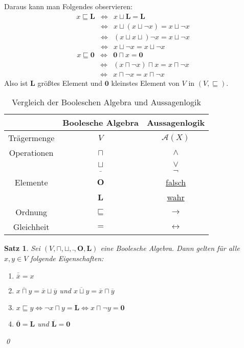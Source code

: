 \documentclass[ngerman]{scrartcl}
\theoremstyle{custom}
\newtheorem{ms}[mdef]{Satz}
\newcommand{\ax}{\mathcal{A}(X)}
\newcommand{\0}{\mathbf{0}}
\newcommand{\1}{\mathbf{L}}
\begin{document}
Daraus kann man Folgendes observieren:
\begin{eqnarray*}
x \sqsubseteq \mathbf{L} &\Leftrightarrow& x \sqcup \mathbf{L} = \mathbf{L} \\
&\Leftrightarrow& x \sqcup (x \sqcup \neg x) = x \sqcup \neg x\\
&\Leftrightarrow& (x \sqcup x \sqcup) \neg x = x \sqcup \neg x\\
&\Leftrightarrow& x \sqcup \neg x = x \sqcup \neg x
\end{eqnarray*}
\begin{eqnarray*}
x \sqsubseteq \mathbf{0} &\Leftrightarrow& \mathbf{0} \sqcap x =
\mathbf{0} \\
&\Leftrightarrow& (x \sqcap \neg x) \sqcap x = x \sqcap \neg x \\
&\Leftrightarrow& x \sqcap \neg x = x \sqcap \neg x
\end{eqnarray*}
Also ist $\mathbf{L}$ gr\"o\ss tes Element und $\mathbf{0}$ kleinstes Element von $V$ in $(V,
\sqsubseteq)$.

\begin{table}[h]
\center
\begin{tabular}{c|c|c}
& Boolesche Algebra & Aussagenlogik \\
\hline Tr\"agermenge & $V$ & $\ax$ \\
Operationen & $\sqcap$ & $\wedge$ \\
& $\sqcup$ & $\vee$ \\
& $\bar ~$ & $\neg$ \\
Elemente & $\mathbf{O}$ & \underline{falsch} \\
& $\mathbf{L}$& \underline{wahr}\\
Ordnung & $\sqsubseteq$ & $\rightarrow$ \\
Gleichheit & $=$ & $\leftrightarrow$
\end{tabular}
\caption{Vergleich der Booleschen Algebra und Aussagenlogik}
\end{table}

\begin{ms} 
Sei $(V, \sqcap, \sqcup, \bar ~, \mathbf{O}, \mathbf{L})$ eine
Boolesche Algebra. Dann gelten f\"ur alle $x,y \in V$ folgende
Eigenschaften:
\begin{enumerate}
\item $\overline{\overline{x}} = x$
\item $\overline{x \sqcap y} = \overline{x} \sqcup \overline{y}$ und
  $\overline{x \sqcup y} = \overline{x} \sqcap \overline{y}$
\item $x \sqsubseteq y \Leftrightarrow \neg x \sqcap y = \mathbf{L}
  \Leftrightarrow x \sqcap \neg y = \mathbf{0}$
\item $\overline{\mathbf{0}} = \mathbf{L}$ und $\overline{\mathbf{L}}
  = \mathbf{0}$
\end{enumerate}
\qed
\end{ms}
\end{document}
